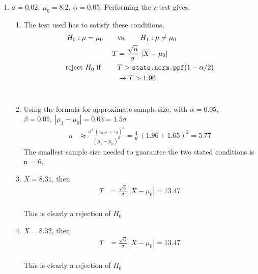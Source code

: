 \begin{enumerate}
	
	\item $ \sigma = 0.02,\ \mu_0 = 8.2,\ \alpha = 0.05$. Performing the z-test gives,\\
	
		\begin{enumerate}
			\item The test used has to satisfy these conditions,\\
			\begin{align}
				H_0 : \mu = \mu_0 \qquad &\text{vs.} \qquad H_1 : \mu \neq \mu_0 \nonumber \\
				T &= \frac{\sqrt{n}}{\sigma}\ |\overline{X} - \mu_0| \nonumber \\
				\text{reject $ H_0 $ if } \qquad & T > \texttt{stats.norm.ppf}(1-\alpha/2) \nonumber \\
				&\to T > 1.96
			\end{align}\\
			
			\item Using the formula for approximate sample size, with $ \alpha = 0.05,$ \\
			$ \beta = 0.05,\ |\mu_1 - \mu_0| = 0.03 = 1.5\sigma $\\
			\begin{align}
				n &\approx \frac{\sigma^2\ (z_{\alpha/2} + z_\beta)^2}{(\mu_1 - \mu_0)^2} = \frac{4}{9}\ (1.96 + 1.65)^2 = 5.77
			\end{align}
			The smallest sample size needed to guarantee the two stated conditions is n = 6.\\
			
			\item $ \overline{X} = 8.31 $, then\\
			\begin{align}
				T &= \frac{\sqrt{6}}{\sigma}\ |\overline{X} - \mu_0| = 13.47 \nonumber \\
			\end{align}
			
			This is clearly a rejection of $ H_0 $\\
			
			\item $ \overline{X} = 8.32 $, then\\
			\begin{align}
				T &= \frac{\sqrt{6}}{\sigma}\ |\overline{X} - \mu_0| = 13.47 \nonumber \\
			\end{align}
			
			This is clearly a rejection of $ H_0 $\\
			

\end{enumerate}
\end{enumerate}

